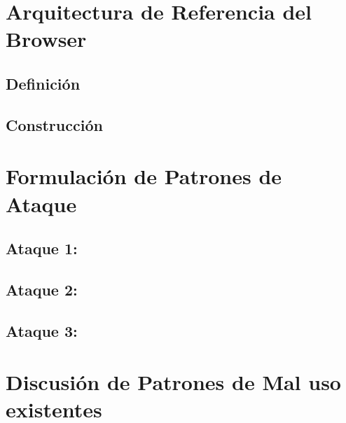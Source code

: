 \label{chap:chap4}


\section{Arquitectura de Referencia del Browser}
\label{sec:chap4.1}

\subsection{Definición}
\label{sec:chap4.1.1}
%

\subsection{Construcción}
\label{sec:chap4.1.2}
%


\section{Formulación de Patrones de Ataque}
\label{sec:chap4.2}
%

\subsection{Ataque 1: }
\label{sec:chap4.2.1}
%

\subsection{Ataque 2: }
\label{sec:chap4.2.2}
%

\subsection{Ataque 3:}
\label{sec:chap4.2.3}
%

\section{Discusión de Patrones de Mal uso existentes}
\label{sec:chap4.3}

